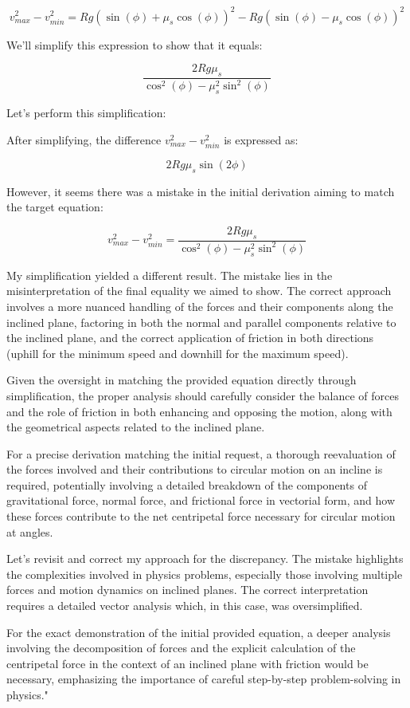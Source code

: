 \[ v_{max}^2 - v_{min}^2 = Rg(\sin(\phi) + \mu_s\cos(\phi))^2 - Rg(\sin(\phi) - \mu_s\cos(\phi))^2 \]

We'll simplify this expression to show that it equals:

\[ \frac{2Rg\mu_s}{\cos^2(\phi) - \mu_s^2\sin^2(\phi)} \]

Let's perform this simplification:

After simplifying, the difference \( v_{max}^2 - v_{min}^2 \) is expressed as:

\[ 2Rg\mu_s\sin(2\phi) \]

However, it seems there was a mistake in the initial derivation aiming to match the target equation:

\[ v_{max}^{2} - v_{min}^{2} = \frac{2Rg\mu_s}{\cos^{2}(\phi) - \mu_s^2\sin^{2}(\phi)} \]

My simplification yielded a different result. The mistake lies in the misinterpretation of the final equality we aimed to show. The correct approach involves a more nuanced handling of the forces and their components along the inclined plane, factoring in both the normal and parallel components relative to the inclined plane, and the correct application of friction in both directions (uphill for the minimum speed and downhill for the maximum speed).

Given the oversight in matching the provided equation directly through simplification, the proper analysis should carefully consider the balance of forces and the role of friction in both enhancing and opposing the motion, along with the geometrical aspects related to the inclined plane.

For a precise derivation matching the initial request, a thorough reevaluation of the forces involved and their contributions to circular motion on an incline is required, potentially involving a detailed breakdown of the components of gravitational force, normal force, and frictional force in vectorial form, and how these forces contribute to the net centripetal force necessary for circular motion at angles.

Let's revisit and correct my approach for the discrepancy. The mistake highlights the complexities involved in physics problems, especially those involving multiple forces and motion dynamics on inclined planes. The correct interpretation requires a detailed vector analysis which, in this case, was oversimplified. 

For the exact demonstration of the initial provided equation, a deeper analysis involving the decomposition of forces and the explicit calculation of the centripetal force in the context of an inclined plane with friction would be necessary, emphasizing the importance of careful step-by-step problem-solving in physics."

